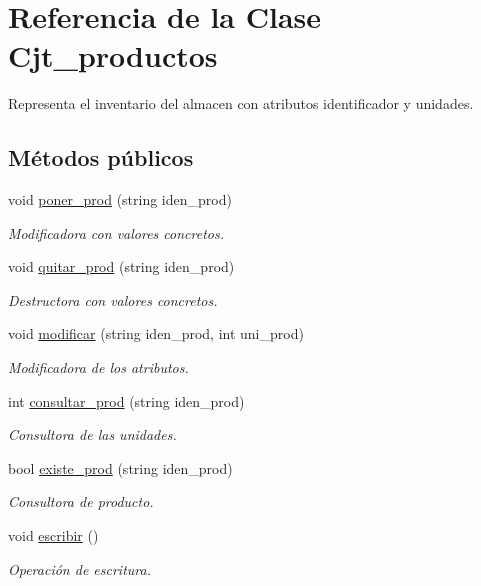 \hypertarget{class_cjt__productos}{}\section{Referencia de la Clase Cjt\+\_\+productos}
\label{class_cjt__productos}


Representa el inventario del almacen con atributos identificador y unidades.  


\subsection*{Métodos públicos}
\begin{DoxyCompactItemize}
\item 
void \hyperlink{class_cjt__productos_a501153e137c6437ff84faac121a88bc8}{poner\+\_\+prod} (string iden\+\_\+prod)
\begin{DoxyCompactList}\small\item\em Modificadora con valores concretos. \end{DoxyCompactList}\item 
void \hyperlink{class_cjt__productos_a2da6626c288772c1169dcf32c39202e6}{quitar\+\_\+prod} (string iden\+\_\+prod)
\begin{DoxyCompactList}\small\item\em Destructora con valores concretos. \end{DoxyCompactList}\item 
void \hyperlink{class_cjt__productos_ac120487a0d46654b0d89654f20055083}{modificar} (string iden\+\_\+prod, int uni\+\_\+prod)
\begin{DoxyCompactList}\small\item\em Modificadora de los atributos. \end{DoxyCompactList}\item 
int \hyperlink{class_cjt__productos_a8198f3b57f6d1d9fd4096e3e19fe9a46}{consultar\+\_\+prod} (string iden\+\_\+prod)
\begin{DoxyCompactList}\small\item\em Consultora de las unidades. \end{DoxyCompactList}\item 
bool \hyperlink{class_cjt__productos_a33f8148c4da6fe03d49c993e4b477494}{existe\+\_\+prod} (string iden\+\_\+prod)
\begin{DoxyCompactList}\small\item\em Consultora de producto. \end{DoxyCompactList}\item 
void \hyperlink{class_cjt__productos_a51582783f3f107f84cc3c5f8cccded36}{escribir} ()
\begin{DoxyCompactList}\small\item\em Operación de escritura. \end{DoxyCompactList}\end{DoxyCompactItemize}
